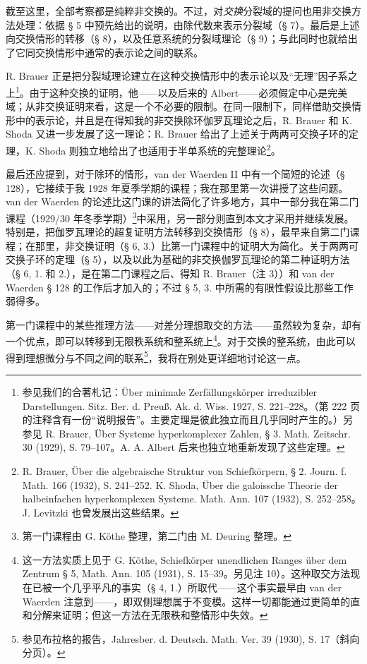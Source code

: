 \documentclass[11pt]{article}
\begin{document}
截至这里，全部考察都是纯粹非交换的。不过，对\emph{交换}分裂域的提问也用非交换方法处理：依据 § 5 中预先给出的说明，由除代数来表示分裂域（§ 7）。最后是上述向交换情形的转移（§ 8），以及任意系统的分裂域理论（§ 9）；与此同时也就给出了它同交换情形中通常的表示论之间的联系。

R. Brauer 正是把分裂域理论建立在这种交换情形中的表示论以及“无理”因子系之上\footnote{参见我们的合著札记：Über minimale Zerfällungskörper irreduzibler Darstellungen. Sitz. Ber. d. Preuß. Ak. d. Wiss. 1927, S. 221--228。（第 222 页的注释含有一份“说明报告”。主要定理是彼此独立而且几乎同时产生的。）另参见 R. Brauer, Über Systeme hyperkomplexer Zahlen, § 3. Math. Zeitschr. 30 (1929), S. 79--107。A. A. Albert 后来也独立地重新发现了这些定理。}。由于这种交换的证明，他——以及后来的 Albert——必须假定中心是完美域；从非交换证明来看，这是一个不必要的限制。在同一限制下，同样借助交换情形中的表示论，并且是在得知我的非交换除环伽罗瓦理论之后，R. Brauer 和 K. Shoda 又进一步发展了这一理论：R. Brauer 给出了上述关于两两可交换子环的定理，K. Shoda 则独立地给出了也适用于半单系统的完整理论\footnote{R. Brauer, Über die algebraische Struktur von Schiefkörpern, § 2. Journ. f. Math. 166 (1932), S. 241--252. K. Shoda, Über die galoissche Theorie der halbeinfachen hyperkomplexen Systeme. Math. Ann. 107 (1932), S. 252--258。J. Levitzki 也曾发展出这些结果。}。

最后还应提到，对于除环的情形，van der Waerden II 中有一个简短的论述（§ 128），它接续于我 1928 年夏季学期的课程；我在那里第一次讲授了这些问题。van der Waerden 的论述比这门课的讲法简化了许多地方，其中一部分我在第二门课程（1929/30 年冬季学期）\footnote{第一门课程由 G. Köthe 整理，第二门由 M. Deuring 整理。}中采用，另一部分则直到本文才采用并继续发展。特别是，把伽罗瓦理论的超复证明方法转移到交换情形（§ 8），最早来自第二门课程；在那里，非交换证明（§ 6, 3.）比第一门课程中的证明大为简化。关于两两可交换子环的定理（§ 5），以及以此为基础的非交换伽罗瓦理论的第二种证明方法（§ 6, 1. 和 2.），是在第二门课程之后、得知 R. Brauer（注 3））和 van der Waerden § 128 的工作后才加入的；不过 § 5, 3. 中所需的有限性假设比那些工作弱得多。

第一门课程中的某些推理方法——对差分理想取交的方法——虽然较为复杂，却有一个优点，即可以转移到无限秩系统和整系统上\footnote{这一方法实质上见于 G. Köthe, Schiefkörper unendlichen Ranges über dem Zentrum § 5, Math. Ann. 105 (1931), S. 15--39。另见注 10）。这种取交方法现在已被一个几乎平凡的事实（§ 4, 1.）所取代——这个事实最早由 van der Waerden 注意到——，即双侧理想属于不变模。这样一切都能通过更简单的直和分解来证明；但这一方法在无限秩和整情形中失效。}。对于交换的整系统，由此可以得到理想微分与不同之间的联系\footnote{参见布拉格的报告，Jahresber. d. Deutsch. Math. Ver. 39 (1930), S. 17（斜向分页）。}，我将在别处更详细地讨论这一点。
\end{document}
